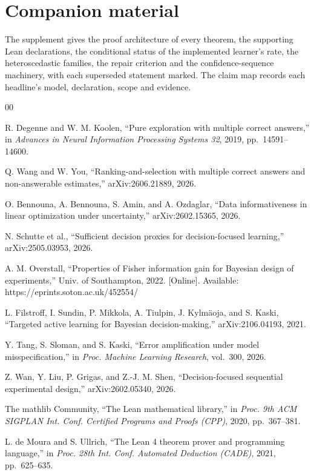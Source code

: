 \section*{Companion material}
The supplement gives the proof architecture of every theorem, the supporting Lean declarations,
the conditional status of the implemented learner's rate, the heteroscedastic families, the
repair criterion and the confidence-sequence machinery, with each superseded statement marked.
The claim map records each headline's model, declaration, scope and evidence.

\begin{thebibliography}{00}

 R. Degenne and W. M. Koolen, ``Pure exploration with multiple correct
answers,'' in \emph{Advances in Neural Information Processing Systems 32}, 2019,
pp.~14591--14600.

 Q. Wang and W. You, ``Ranking-and-selection with multiple correct
answers and non-answerable estimates,'' arXiv:2606.21889, 2026.

 O. Bennouna, A. Bennouna, S. Amin, and A. Ozdaglar, ``Data
informativeness in linear optimization under uncertainty,'' arXiv:2602.15365, 2026.

 N. Schutte et al., ``Sufficient decision proxies for
decision-focused learning,'' arXiv:2505.03953, 2026.

 A. M. Overstall, ``Properties of Fisher information gain for
Bayesian design of experiments,'' Univ. of Southampton, 2022. [Online]. Available:
https://eprints.soton.ac.uk/452554/

 L. Filstroff, I. Sundin, P. Mikkola, A. Tiulpin, J. Kylm\"{a}oja,
and S. Kaski, ``Targeted active learning for Bayesian decision-making,'' arXiv:2106.04193,
2021.

 Y. Tang, S. Sloman, and S. Kaski, ``Error amplification under model
misspecification,'' in \emph{Proc. Machine Learning Research}, vol.~300, 2026.

 Z. Wan, Y. Liu, P. Grigas, and Z.-J. M. Shen, ``Decision-focused
sequential experimental design,'' arXiv:2602.05340, 2026.

 The mathlib Community, ``The Lean mathematical library,'' in
\emph{Proc. 9th ACM SIGPLAN Int. Conf. Certified Programs and Proofs (CPP)}, 2020,
pp.~367--381.

 L. de Moura and S. Ullrich, ``The Lean 4 theorem prover and
programming language,'' in \emph{Proc. 28th Int. Conf. Automated Deduction (CADE)}, 2021,
pp.~625--635.

\end{thebibliography}


